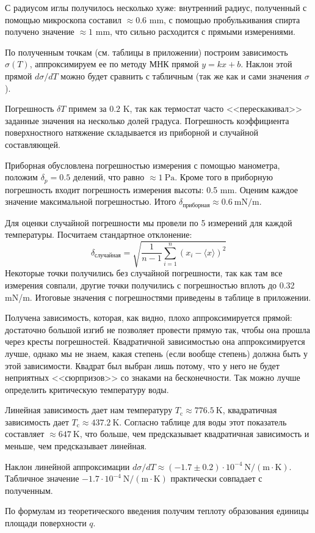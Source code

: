 \documentclass[a4paper,12pt]{report}
\begin{document}
\begin{multicols}{2}
        С радиусом иглы получилось несколько хуже: внутренний радиус, полученный с помощью микроскопа составил $\approx 0.6$ mm, с помощью пробулькивания спирта получено значение $\approx 1$ mm, что сильно расходится с прямыми измерениями.

        По полученным точкам (см. таблицы в приложении) построим зависимость $\sigma(T)$, аппроксимируем ее по методу МНК прямой $y=kx+b$. Наклон этой прямой $d\sigma/dT$ можно будет сравнить с табличным (так же как и сами значения $\sigma$).

        Погрешность $\delta T$ примем за $0.2$ K, так как термостат часто <<перескакивал>> заданные значения на несколько долей градуса. Погрешность коэффициента поверхностного натяжение складывается из приборной и случайной составляющей.
        
        Приборная обусловлена погрешностью измерения с помощью манометра, положим $\delta_p=0.5$ делений, что равно $\approx 1 \ \text{Pa}$. Кроме того в приборную погрешность входит погрешность измерения высоты: 0.5 mm. Оценим каждое значение максимальной погрешностью. Итого $\delta_\text{приборная}\approx 0.6 \ \text{mN}/\text{m}$.

        Для оценки случайной погрешности мы провели по 5 измерений для каждой температуры. Посчитаем стандартное отклонение:
        \begin{equation*}
            \delta_\text{случайная}=\sqrt{\frac{1}{n-1}\sum_{i=1}^{n}(x_i-\langle x \rangle)^2}
        \end{equation*}
        Некоторые точки получились без случайной погрешности, так как там все измерения совпали, другие точки получились с погрешностью вплоть до 0.32 mN/m. Итоговые значения с погрешностями приведены в таблице в приложении.

        
        Получена зависимость, которая, как видно, плохо аппроксимируется прямой: достаточно большой изгиб не позволяет провести прямую так, чтобы она прошла через кресты погрешностей. Квадратичной зависимостью она аппроксимируется лучше, однако мы не знаем, какая степень (если вообще степень) должна быть у этой зависимости. Квадрат был выбран лишь потому, что у него не будет неприятных <<сюрпризов>> со знаками на бесконечности. Так можно лучше определить критическую температуру воды.

        Линейная зависимость дает нам температуру $T_\text{c}\approx 776.5 \ \text{K}$, квадратичная зависимость дает $T_\text{c}\approx 437.2 \ \text{K}$. Согласно таблице для воды этот показатель составляет $\approx 647 \ \text{K}$, что больше, чем предсказывает квадратичная зависимость и меньше, чем предсказывает линейная.

        Наклон линейной аппроксимации $d\sigma/dT\approx (-1.7\pm0.2)\cdot 10^{-4} \ \text{N}/(\text{m}\cdot\text{K})$. Табличное значение $-1.7\cdot 10^{-4}\ \text{N}/(\text{m}\cdot \text{K})$ практически совпадает с полученным.

        По формулам из теоретического введения получим теплоту образования единицы площади поверхности $q$.

    \end{multicols}
\end{document}
